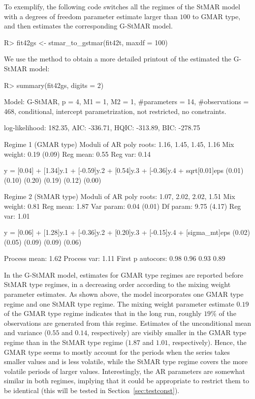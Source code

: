 \documentclass[nojss]{jss} %
\begin{document}
To exemplify, the following code switches all the regimes of the StMAR model  with a degrees of freedom parameter estimate larger than $100$ to GMAR type, and then estimates the corresponding G-StMAR model.
%
\begin{CodeChunk}
\begin{CodeInput}
R> fit42gs <- stmar_to_gstmar(fit42t, maxdf = 100)
\end{CodeInput}
\end{CodeChunk}
%
We use the  method to obtain a more detailed printout of the estimated the G-StMAR model:
%
\begin{CodeChunk}
\begin{CodeInput}
R> summary(fit42gs, digits = 2)
\end{CodeInput}
\begin{CodeOutput}
Model:
 G-StMAR, p = 4, M1 = 1, M2 = 1, #parameters = 14, #observations = 468,
 conditional, intercept parametrization, not restricted, no constraints.

 log-likelihood: 182.35, AIC: -336.71, HQIC: -313.89, BIC: -278.75

Regime 1 (GMAR type)
Moduli of AR poly roots: 1.16, 1.45, 1.45, 1.16
Mix weight: 0.19 (0.09)
Reg mean: 0.55
Reg var:  0.14

y = [0.04] + [1.34]y.1 + [-0.59]y.2 + [0.54]y.3 + [-0.36]y.4 + sqrt[0.01]eps
    (0.01)   (0.10)       (0.20)      (0.19)       (0.12)          (0.00)

Regime 2 (StMAR type)
Moduli of AR poly roots: 1.07, 2.02, 2.02, 1.51
Mix weight: 0.81
Reg mean: 1.87
Var param: 0.04 (0.01)
Df param: 9.75 (4.17)
Reg var:  1.01

y = [0.06] + [1.28]y.1 + [-0.36]y.2 + [0.20]y.3 + [-0.15]y.4 + [sigma_mt]eps
    (0.02)   (0.05)       (0.09)      (0.09)       (0.06)

Process mean: 1.62
Process var:  1.11
First p autocors: 0.98 0.96 0.93 0.89
\end{CodeOutput}
\end{CodeChunk}
%
In the G-StMAR model, estimates for GMAR type regimes are reported before StMAR type regimes, in a decreasing order according to the mixing weight parameter estimates. As shown above, the model  incorporates one GMAR type regime and one StMAR type regime. The mixing weight parameter estimate $0.19$ of the GMAR type regime indicates that in the long run, roughly $19\%$ of the observations are generated from this regime. Estimates of the unconditional mean and variance ($0.55$ and $0.14$, respectively) are visibly smaller in the GMAR type regime than in the StMAR type regime ($1.87$ and $1.01$, respectively). Hence, the GMAR type seems to mostly account for the periods when the series takes smaller values and is less volatile, while the StMAR type regime covers the more volatile periods of larger values. Interestingly, the AR parameters are somewhat similar in both regimes, implying that it could be appropriate to restrict them to be identical (this will be tested in Section~\ref{sec:testconst}).
\end{document}
